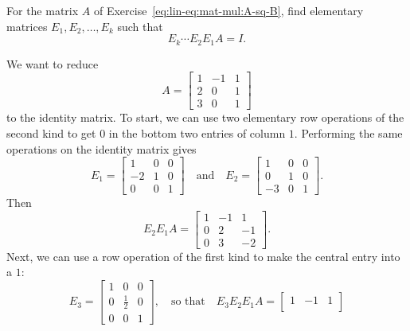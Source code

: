  For the matrix $A$ of
Exercise~\ref{eq:lin-eq:mat-mul:A-sq-B}, find elementary matrices
$E_1, E_2, \dots, E_k$ such that
\begin{equation*}
  E_k\cdots E_2E_1A = I.
\end{equation*}
\begin{solution}
  We want to reduce
  \begin{equation*}
    A =
    \begin{bmatrix}
      1 & -1 & 1 \\
      2 & 0 & 1 \\
      3 & 0 & 1
    \end{bmatrix}
  \end{equation*}
  to the identity matrix. To start, we can use two elementary row
  operations of the second kind to get $0$ in the bottom two entries
  of column $1$. Performing the same operations on the identity matrix
  gives
  \begin{equation*}
    E_1 =
    \begin{bmatrix}
      1 & 0 & 0 \\
      -2 & 1 & 0 \\
      0 & 0 & 1
    \end{bmatrix}
    \quad\text{and}\quad
    E_2 =
    \begin{bmatrix}
      1 & 0 & 0 \\
      0 & 1 & 0 \\
      -3 & 0 & 1
    \end{bmatrix}.
  \end{equation*}
  Then
  \begin{equation*}
    E_2E_1A =
    \begin{bmatrix}
      1 & -1 & 1 \\
      0 & 2 & -1 \\
      0 & 3 & -2
    \end{bmatrix}.
  \end{equation*}
  Next, we can use a row operation of the first kind to make the
  central entry into a $1$:
  \begin{equation*}
    E_3 =
    \begin{bmatrix}
      1 & 0 & 0 \\[3pt]
      0 & \frac12 & 0 \\[3pt]
      0 & 0 & 1
    \end{bmatrix},
    \quad\text{so that}\quad
    E_3E_2E_1A =
    \begin{bmatrix}
      1 & -1 & 1 \\[3pt]

\end{bmatrix}
\end{equation*}
\end{solution}
